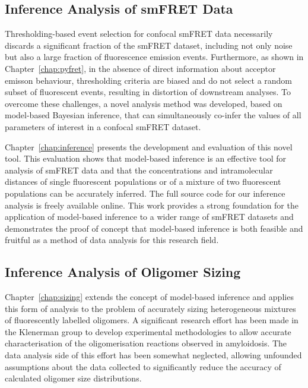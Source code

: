 \subsection{Inference Analysis of smFRET Data}
Thresholding-based event selection for confocal smFRET data necessarily discards a significant fraction of the smFRET dataset, including not only noise but also a large fraction of fluorescence emission events. Furthermore, as shown in Chapter~\ref{chap:pyfret}, in the absence of direct information about acceptor emisson behaviour, thresholding criteria are biased and do not select a random subset of fluorescent events, resulting in distortion of downstream analyses. To overcome these challenges, a novel analysis method was developed, based on model-based Bayesian inference, that can simultaneously co-infer the values of all parameters of interest in a confocal smFRET dataset.

Chapter~\ref{chap:inference} presents the development and evaluation of this novel tool. This evaluation shows that model-based inference is an effective tool for analysis of smFRET data and that the concentrations and intramolecular distances of single fluorescent populations or of a mixture of two fluorescent populations can be accurately inferred. The full source code for our inference analysis is freely available online. This work provides a strong foundation for the application of model-based inference to a wider range of smFRET datasets and demonstrates the proof of concept that model-based inference is both feasible and fruitful as a method of data analysis for this research field.  

\subsection{Inference Analysis of Oligomer Sizing}
Chapter~\ref{chap:sizing} extends the concept of model-based inference and applies this form of analysis to the problem of accurately sizing heterogeneous mixtures of fluorescently labelled oligomers. A significant research effort has been made in the Klenerman group to develop experimental methodologies to allow accurate characterisation of the oligomerisation reactions observed in amyloidosis. The data analysis side of this effort has been somewhat neglected, allowing unfounded assumptions about the data collected to significantly reduce the accuracy of calculated oligomer size distributions.

